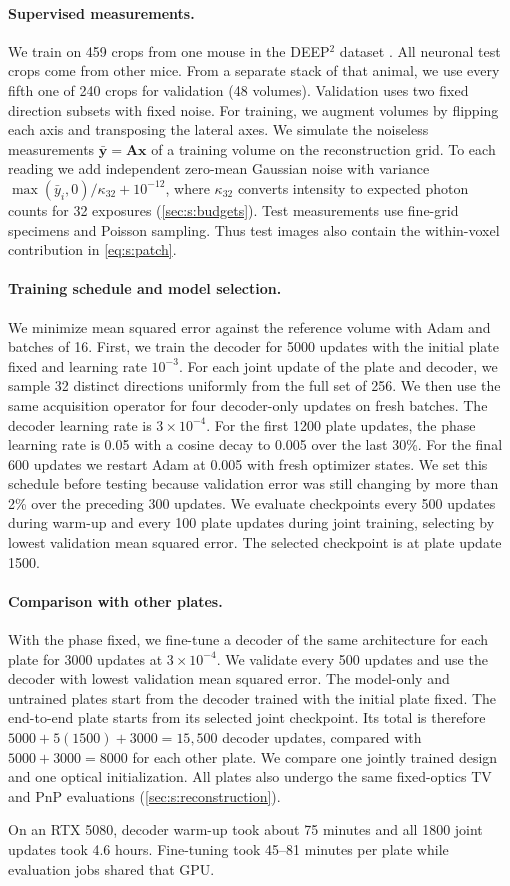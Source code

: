 \paragraph{Supervised measurements.}
We train on 459 crops from one mouse in the DEEP$^2$ dataset \cite{wijethilake2023data}. All neuronal test crops come from other mice. From a separate stack of that animal, we use every fifth one of 240 crops for validation (48 volumes). Validation uses two fixed direction subsets with fixed noise. For training, we augment volumes by flipping each axis and transposing the lateral axes. We simulate the noiseless measurements $\bar{\mathbf y}=\mathbf A\mathbf x$ of a training volume on the reconstruction grid. To each reading we add independent zero-mean Gaussian noise with variance $\max(\bar y_i,0)/\kappa_{32}+10^{-12}$, where $\kappa_{32}$ converts intensity to expected photon counts for 32 exposures (\cref{sec:s:budgets}). Test measurements use fine-grid specimens and Poisson sampling. Thus test images also contain the within-voxel contribution in \cref{eq:s:patch}.

\paragraph{Training schedule and model selection.}
We minimize mean squared error against the reference volume with Adam and batches of 16. First, we train the decoder for 5000 updates with the initial plate fixed and learning rate $10^{-3}$. For each joint update of the plate and decoder, we sample 32 distinct directions uniformly from the full set of 256. We then use the same acquisition operator for four decoder-only updates on fresh batches. The decoder learning rate is $3\times10^{-4}$. For the first 1200 plate updates, the phase learning rate is 0.05 with a cosine decay to 0.005 over the last 30\%. For the final 600 updates we restart Adam at 0.005 with fresh optimizer states. We set this schedule before testing because validation error was still changing by more than 2\% over the preceding 300 updates. We evaluate checkpoints every 500 updates during warm-up and every 100 plate updates during joint training, selecting by lowest validation mean squared error. The selected checkpoint is at plate update 1500.

\paragraph{Comparison with other plates.}
With the phase fixed, we fine-tune a decoder of the same architecture for each plate for 3000 updates at $3\times10^{-4}$. We validate every 500 updates and use the decoder with lowest validation mean squared error. The model-only and untrained plates start from the decoder trained with the initial plate fixed. The end-to-end plate starts from its selected joint checkpoint. Its total is therefore $5000+5(1500)+3000=15{,}500$ decoder updates, compared with $5000+3000=8000$ for each other plate. We compare one jointly trained design and one optical initialization. All plates also undergo the same fixed-optics TV and PnP evaluations (\cref{sec:s:reconstruction}).

On an RTX 5080, decoder warm-up took about 75 minutes and all 1800 joint updates took 4.6 hours. Fine-tuning took 45--81 minutes per plate while evaluation jobs shared that GPU.
